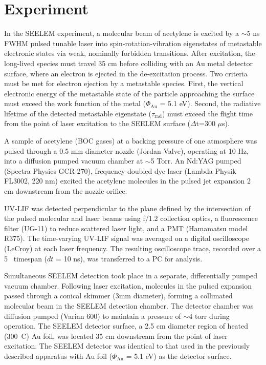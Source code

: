\section{Experiment}

In the SEELEM experiment, a molecular beam of acetylene is excited by
a $\sim$5 ns FWHM pulsed tunable laser into spin-rotation-vibration
eigenstates of metastable electronic states via weak, nominally
forbidden transitions. After excitation, the long-lived species must
travel 35 cm before colliding with an Au metal detector surface, where
an electron is ejected in the de-excitation process. Two criteria must
be met for electron ejection by a metastable species. First, the
vertical electronic energy of the metastable state of the particle
approaching the surface must exceed the work function of the metal
($\Phi_{\text{Au}}$ = 5.1 eV). Second, the radiative lifetime of the
detected metastable eigenstate ($\tau_\text{rad}$) must exceed the
flight time from the point of laser excitation to the SEELEM surface
($\Delta$t=300 $\mu$s).

A sample of acetylene (BOC gases) at a backing pressure of one
atmosphere was pulsed through a 0.5 mm diameter nozzle (Jordan Valve),
operating at 10 Hz, into a diffusion pumped vacuum chamber at
$\sim$5 Torr.  An Nd:YAG pumped (Spectra Physics GCR-270),
frequency-doubled dye laser (Lambda Physik FL3002, 220 nm) excited the
acetylene molecules in the pulsed jet expansion 2 cm downstream from
the nozzle orifice.  %

UV-LIF was detected perpendicular to the plane defined by the
intersection of the pulsed molecular and laser beams using f/1.2
collection optics, a fluorescence filter (UG-11) to reduce scattered
laser light, and a PMT (Hamamatsu model R375).  The time-varying
UV-LIF signal was averaged on a digital oscilloscope (LeCroy) 
at each laser frequency.  The resulting oscilloscope trace,
recorded over a 5 \microsec\ timespan ($dt$ = 10 ns), was transferred
to a PC for analysis.

Simultaneous SEELEM detection took place in a separate, differentially
pumped vacuum chamber.  Following laser excitation, molecules in the
pulsed expansion passed through a conical skimmer (3mm diameter),
forming a collimated molecular beam in the SEELEM detection chamber.
The detector chamber was diffusion pumped (Varian 600) to maintain a
pressure of $\sim$4 torr during operation.  The SEELEM detector
surface, a 2.5 cm diameter region of heated (300\degrees\ C) Au foil,
was located 35 cm downstream from the point of laser excitation.  The
SEELEM detector was identical to that used in the previously described
apparatus with Au foil ($\Phi_{\text{Au}}$ = 5.1 eV) as the detector
surface.

